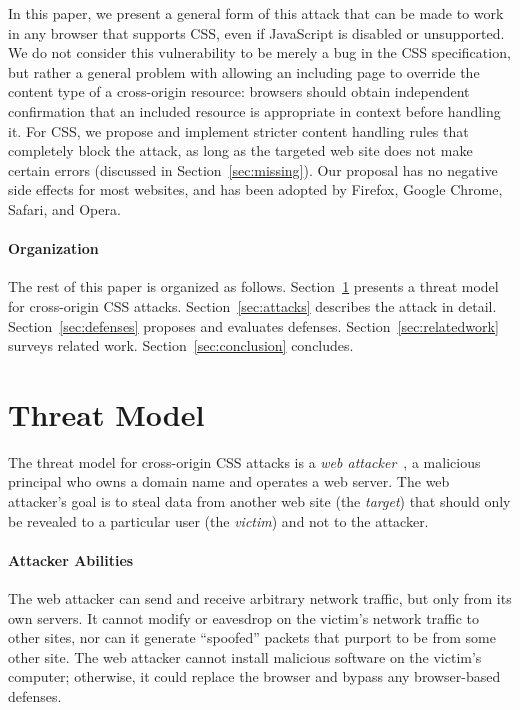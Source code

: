 \documentclass{sig-alternate}
\begin{document}
In this paper, we present a general form of this attack that can be
made to work in any browser that supports CSS, even if JavaScript is
disabled or unsupported.  We do not consider this vulnerability to be
merely a bug in the CSS specification, but rather a general problem
with allowing an including page to override the content type of a
cross-origin resource: browsers should obtain independent confirmation
that an included resource is appropriate in context before handling
it.  For CSS, we propose and implement stricter content handling rules
that completely block the attack, as long as the targeted web site
does not make certain errors (discussed in
Section~\ref{sec:missing}). Our proposal has no negative side effects
for most websites, and has been adopted by Firefox, Google Chrome,
Safari, and Opera.

\paragraph{Organization}
The rest of this paper is organized as
follows. Section~\ref{sec:threatmodel} presents a threat model for
cross-origin CSS attacks.  Section~\ref{sec:attacks} describes the
attack in detail. Section~\ref{sec:defenses} proposes and evaluates
defenses.  Section~\ref{sec:relatedwork} surveys related work.
Section~\ref{sec:conclusion} concludes.

\section{Threat Model} \label{sec:threatmodel}

The threat model for cross-origin CSS attacks is a \emph{web
attacker}~\cite{jackson09thesis}, a malicious principal who
owns a domain name and operates a web server. The web attacker's
goal is to steal data from another web site (the \emph{target})
that should only be revealed to a particular user (the
\emph{victim}) and not to the attacker.

\paragraph{Attacker Abilities}
The web attacker can send and receive arbitrary network traffic, but
only from its own servers. It cannot modify or eavesdrop on the
victim's network traffic to other sites, nor can it generate “spoofed”
packets that purport to be from some other site. The web attacker
cannot install malicious software on the victim's computer; otherwise,
it could replace the browser and bypass any browser-based defenses.
\end{document}
